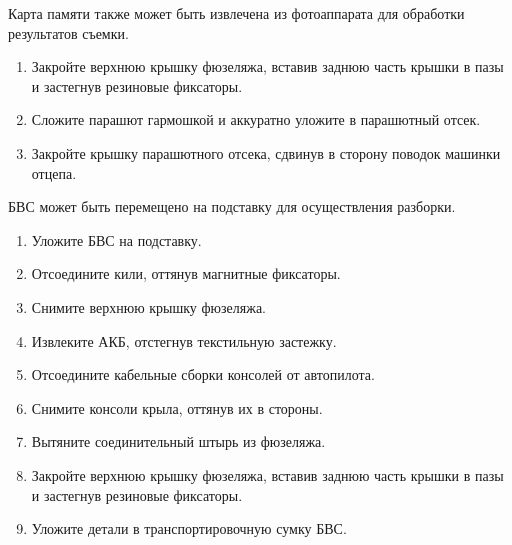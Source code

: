 \documentclass[a4paper,10pt,russian,openany]{sphinxmanual}
\begin{document}
Карта памяти также может быть извлечена из фотоаппарата для обработки результатов съемки.
\begin{enumerate}
\def\theenumi{\arabic{enumi}}
\def\labelenumi{\theenumi )}
\makeatletter\def\p@enumii{\p@enumi \theenumi )}\makeatother
\setcounter{enumi}{2}
\item {} 
Закройте верхнюю крышку фюзеляжа, вставив заднюю часть крышки в пазы и застегнув резиновые фиксаторы.

\item {} 
Сложите парашют гармошкой и аккуратно уложите в парашютный отсек.

\item {} 
Закройте крышку парашютного отсека, сдвинув в сторону поводок машинки отцепа.

\end{enumerate}

БВС может быть перемещено на подставку для осуществления разборки.
\begin{enumerate}
\def\theenumi{\arabic{enumi}}
\def\labelenumi{\theenumi )}
\makeatletter\def\p@enumii{\p@enumi \theenumi )}\makeatother
\setcounter{enumi}{5}
\item {} 
Уложите БВС на подставку.

\item {} 
Отсоедините кили, оттянув магнитные фиксаторы.

\item {} 
Снимите верхнюю крышку фюзеляжа.

\item {} 
Извлеките АКБ, отстегнув текстильную застежку.

\item {} 
Отсоедините кабельные сборки консолей от автопилота.

\item {} 
Снимите консоли крыла, оттянув их в стороны.

\item {} 
Вытяните соединительный штырь из фюзеляжа.

\item {} 
Закройте верхнюю крышку фюзеляжа, вставив заднюю часть крышки в пазы и застегнув резиновые фиксаторы.

\item {} 
Уложите детали в транспортировочную сумку БВС.

\end{enumerate}



\renewcommand{\indexname}{Алфавитный указатель}
\printindex
\end{document}
